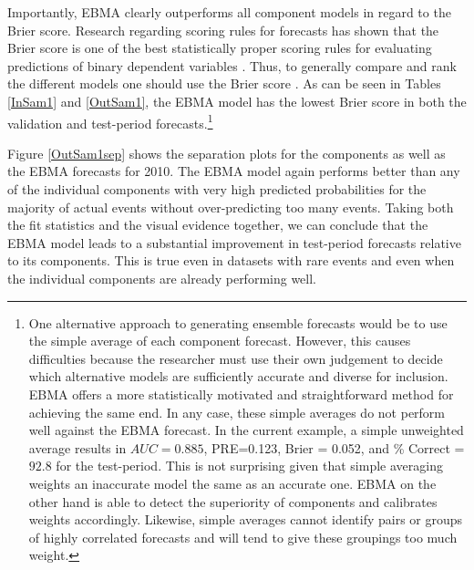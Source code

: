 \documentclass[12pt,fullpage,endnotes]{article}
\newcommand{\note}[1]{\footnote{ #1 \vspace{4 mm}}}
\begin{document}
Importantly, EBMA clearly outperforms all component models in regard
to the Brier score. Research regarding scoring rules for forecasts has
shown that the Brier score is one of the best statistically proper
scoring rules for evaluating predictions of binary dependent variables
\citep{Gneiting_Raftery_2007}.  Thus, to generally compare and rank
the different models one should use the Brier score
\citep{Gneiting_Raftery_2007}. As can be seen in Tables \ref{InSam1}
and \ref{OutSam1}, the EBMA model has the lowest Brier score in both
the validation and test-period forecasts.\note{One alternative
  approach to generating ensemble forecasts would be to use the simple
  average of each component forecast.  However, this causes
  difficulties because the researcher must use their own judgement to
  decide which alternative models are sufficiently accurate and
  diverse for inclusion.  EBMA offers a more statistically motivated
  and straightforward method for achieving the same end.  In any
  case, these simple averages do not perform well against the EBMA
  forecast.  In the current example, a simple unweighted average
  results in $AUC = 0.885$, PRE=0.123, Brier = 0.052, and \% Correct =
  $92.8$ for the test-period.  This is not surprising given that simple
  averaging weights an inaccurate model the same as an accurate
  one. EBMA on the other hand is able to detect the superiority of
  components and calibrates weights accordingly.  Likewise, simple
  averages cannot identify pairs or groups of highly correlated
  forecasts and will tend to give these groupings too much weight.}

Figure \ref{OutSam1sep} shows the separation plots for the components
as well as the EBMA forecasts for 2010.  The EBMA model again performs
better than any of the individual components with very high predicted
probabilities for the majority of actual events without
over-predicting too many events.  Taking both the fit statistics and
the visual evidence together, we can conclude that the EBMA model
leads to a substantial improvement in test-period forecasts relative
to its components.  This is true even in datasets with rare events and
even when the individual components are already performing well.
\end{document}
